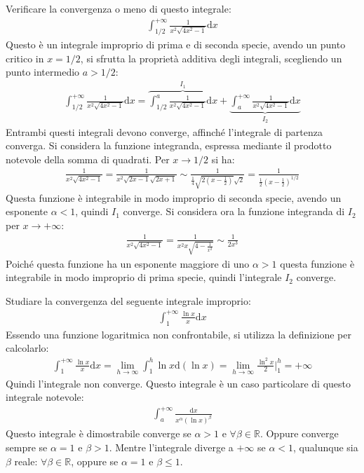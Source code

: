\documentclass{article}
\newcommand{\df}{\mathrm{d}}
\numberwithin{equation}{subsection}
\begin{document}
Verificare la convergenza o meno di questo integrale:
\begin{gather*}
    \displaystyle\int_{1/2}^{+\infty}\frac{1}{x^2\sqrt{4x^2-1}}\df x
\end{gather*}
Questo è un integrale improprio di prima e di seconda specie, avendo un punto critico in $x=1/2$, si sfrutta la proprietà additiva degli integrali, scegliendo un punto intermedio $a>1/2$:
\begin{gather*}
    \displaystyle\int_{1/2}^{+\infty}\frac{1}{x^2\sqrt{4x^2-1}}\df x=
    \overbrace{\int_{1/2}^{a}\frac{1}{x^2\sqrt{4x^2-1}}\df x}^{I_1}+
    \underbrace{\int_{a}^{+\infty}\frac{1}{x^2\sqrt{4x^2-1}}\df x}_{I_2}
\end{gather*}
Entrambi questi integrali devono converge, affinché l'integrale di partenza converga. 
Si considera la funzione integranda, espressa mediante il prodotto notevole della somma di quadrati. Per $x\to1/2$ si ha:
\begin{gather*}
    \displaystyle\frac{1}{x^2\sqrt{4x^2-1}}=\frac{1}{x^2\sqrt{2x-1}\sqrt{2x+1}}\sim\frac{1}{\frac{1}{4}\sqrt{2\left(x-\frac{1}{2}\right)}\sqrt{2}}=\frac{1}{\frac{1}{2}\left(x-\frac{1}{2}\right)^{1/2}}
\end{gather*}
Questa funzione è integrabile in modo improprio di seconda specie, avendo un esponente $\alpha<1$, quindi $I_1$ converge. 
Si considera ora la funzione integranda di $I_2$ per $x\to+\infty$:
\begin{gather*}
    \displaystyle\frac{1}{x^2\sqrt{4x^2-1}}=\frac{1}{x^2x\sqrt{4-\frac{1}{x^2}}}\sim\frac{1}{2x^3}
\end{gather*}
Poiché questa funzione ha un esponente maggiore di uno $\alpha>1$ questa funzione è integrabile in modo improprio di prima specie, quindi l'integrale $I_2$ converge. 


Studiare la convergenza del seguente integrale improprio:
\begin{gather*}
    \displaystyle\int_1^{+\infty}\frac{\ln x}{x}\df x
\end{gather*}
Essendo una funzione logaritmica non confrontabile, si utilizza la definizione per calcolarlo:
\begin{gather*}
    \displaystyle\int_1^{+\infty}\frac{\ln x}{x}\df x=
    \lim_{h\to\infty}\int_1^{h}\ln x\df(\ln x)=
    \lim_{h\to\infty}\frac{\ln^2x}{2}\bigg|_1^h=+\infty
\end{gather*}
Quindi l'integrale non converge. Questo integrale è un caso particolare di questo integrale notevole:
\begin{gather*}
    \displaystyle\int_{a}^{+\infty}\frac{\df x}{x^\alpha(\ln x)^\beta}
\end{gather*}
Questo integrale è dimostrabile converge se $\alpha>1$ e $\forall\beta\in\mathbb{R}$. Oppure converge sempre se $\alpha=1$ e $\beta>1$. Mentre l'integrale diverge a $+\infty$ se $\alpha<1$, qualunque sia $\beta$ reale: $\forall\beta\in\mathbb{R}$, oppure se $\alpha=1$ e $\beta\leq1$. 
\end{document}
